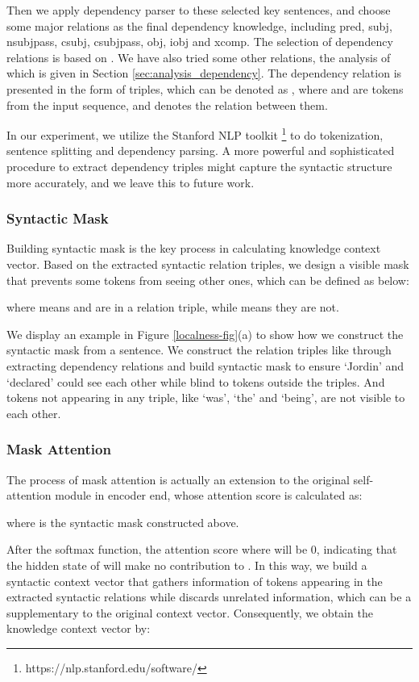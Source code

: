 \documentclass[11pt]{article}
\begin{document}
Then we apply dependency parser to these selected key sentences, and choose some major relations as the final dependency knowledge, including pred, subj, nsubjpass, csubj, csubjpass, obj, iobj and xcomp. The selection of dependency relations is based on \citet{de-marneffe-etal-2014-universal}. We have also tried some other relations, the analysis of which is given in Section \ref{sec:analysis_dependency}.
The dependency relation is presented in the form of triples, which can be denoted as , where  and  are tokens from the input sequence, and  denotes the relation between them. 

In our experiment, we utilize the Stanford NLP toolkit \footnote{https://nlp.stanford.edu/software/} to do tokenization, sentence splitting and dependency parsing. A more powerful and sophisticated procedure to extract dependency triples might capture the syntactic structure more accurately, and we leave this to future work.


\subsubsection{Syntactic Mask}
Building syntactic mask is the key process in calculating knowledge context vector. Based on the extracted syntactic relation triples, we design a visible mask that prevents some tokens from seeing other ones,  which can be defined as below:

where  means  and  are in a relation triple, while  means they are not.


We display an example in Figure \ref{localness-fig}(a) to show how we construct the syntactic mask from a sentence. We construct the relation triples like  through extracting dependency relations and build syntactic mask to ensure `Jordin' and `declared' could see each other 
while blind to tokens outside the triples. And tokens not appearing in any triple, like `was', `the' and `being', are not visible to each other.




\subsubsection{Mask Attention}
The process of mask attention is actually an extension to the original self-attention module in encoder end, whose attention score is calculated as:

where  is the syntactic mask constructed above.

After the softmax function, the attention score where  will be 0, indicating that the hidden state of  will make no contribution to . In this way, we build a syntactic context vector that gathers information of tokens appearing in the extracted syntactic relations while discards unrelated information, which can be a supplementary to the original context vector. Consequently, we obtain the knowledge context vector by:
\end{document}
